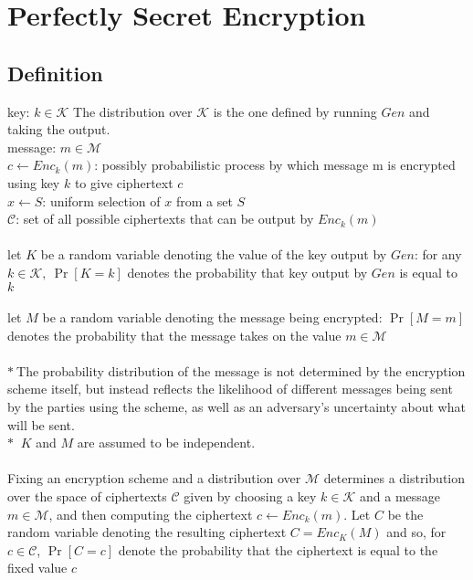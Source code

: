 \section{Perfectly Secret Encryption}

\subsection*{Definition}
key: $k \in \mathcal{K}$ The distribution over $\mathcal{K}$ is 
the one defined by running $Gen$ and taking the output.\\
message: $m \in \mathcal{M}$\\
$c\leftarrow Enc_k(m)$: 
possibly probabilistic process by which 
message m is encrypted using key $k$ to give ciphertext $c$\\
$x \leftarrow S$: uniform selection of $x$ from a set $S$\\
$\mathcal{C}$: set of all possible ciphertexts 
that can be output by $Enc_k(m)$\\\\
let $K$ be a random variable denoting the value of the key output by $Gen$:
for any $k \in \mathcal{K},\ \Pr[K=k]$ denotes the probability that key output
by $Gen$ is equal to $k$\\\\
let $M$ be a random variable denoting the message being encrypted:
$\Pr[M=m]$ denotes the probability that the message takes on the value
$m \in \mathcal{M}$\\\\
$\ast\ $The probability distribution of the message is not 
determined by the encryption scheme itself, but instead reflects the likelihood
 of different messages being sent by the parties using the scheme, as well as an
 adversary’s uncertainty about what will be sent.\\
 $\ast\ $ $K$ and $M$ are assumed to be independent.\\\\
 Fixing an encryption scheme and a distribution over $\mathcal{M}$ determines a
 distribution over the space of ciphertexts $\mathcal{C}$ given by choosing
  a key $k \in \mathcal{K}$ and a message $m \in \mathcal{M}$, and then 
  computing the ciphertext $c \leftarrow Enc_k(m)$. Let $C$ be the random 
  variable denoting the resulting ciphertext $C=Enc_K(M)$ and so, 
  for $c \in \mathcal{C}$, $\Pr[C=c]$ denote the probability that the 
  ciphertext is equal to the fixed value $c$

